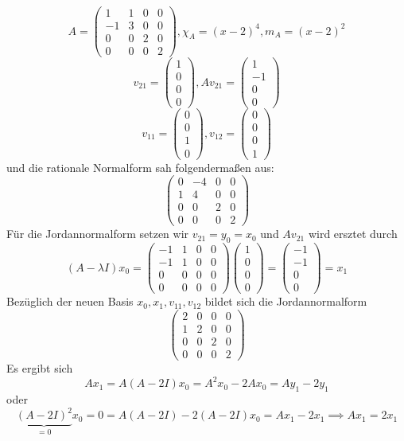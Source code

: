 \documentclass[a4paper, 10pt]{scrbook}
\begin{document}
\begin{ex}
	\[
	A = \begin{pmatrix}1&1&0&0\\-1&3&0&0\\0&0&2&0\\0&0&0&2\end{pmatrix}, \chi_A = (x-2)^4, m_A = (x-2)^2
	\]
	\[
v_{21} = \begin{pmatrix}1\\0\\0\\0\end{pmatrix}, Av_{21} = \begin{pmatrix}1\\-1\\0\\0\end{pmatrix}
	\]
	\[
	v_{11} = \begin{pmatrix}0\\0\\1\\0\end{pmatrix}, v_{12} = \begin{pmatrix}0\\0\\0\\1\end{pmatrix}
	\]
	und die rationale Normalform sah folgendermaßen aus:
	\[
	\begin{pmatrix} 0&-4&0&0\\1&4&0&0\\0&0&2&0\\0&0&0&2\end{pmatrix}
	\]
	Für die Jordannormalform setzen wir $v_{21}=y_0=x_0$ und $Av_{21}$ wird ersztet durch
	\[
	(A-\lambda I)x_0 = \begin{pmatrix}-1&1&0&0\\-1&1&0&0\\0&0&0&0\\0&0&0&0\end{pmatrix}\begin{pmatrix}1\\0\\0\\0\end{pmatrix} = \begin{pmatrix}-1\\-1\\0\\0\end{pmatrix} = x_1
	\]
	Bezüglich der neuen Basis $x_0, x_1, v_{11}, v_{12}$ bildet sich die Jordannormalform
	\[
	\begin{pmatrix}2&0&0&0\\1&2&0&0\\0&0&2&0\\0&0&0&2\end{pmatrix}
	\]
	Es ergibt sich
	\[
		Ax_1 = A(A - 2I)x_0 = A^2 x_0 -2Ax_0 = A y_1 - 2y_1
	\]
	oder
	\[
		\underbrace{(A-2I)^2}_{=0} x_0 = 0 = A(A-2I) - 2(A-2I)x_0 = Ax_1 - 2x_1 \implies Ax_1 = 2x_1
	\]		
\end{ex}
\end{document}
